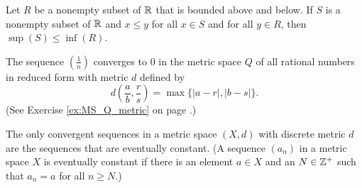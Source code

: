 	\item Let $R$ be a nonempty subset of $\mathbb{R}$ that is bounded above and below. If $S$ is a nonempty subset of $\mathbb{R}$ and $x \leq y$ for all $x \in S$ and for all $y \in R$, then $\sup(S) \leq \inf(R)$. 
	
	\item The sequence $\left(\frac{1}{n}\right)$ converges to $0$ in the metric space $Q$ of all rational numbers in reduced form with metric $d$ defined by
\[d\left(\frac{a}{b}, \frac{r}{s}\right) = \max\{| a-r |, | b-s |\}.\]
(See Exercise \ref{ex:MS_Q_metric} on page \pageref{ex:MS_Q_metric} .)

	\item The only convergent sequences in a metric space $(X,d)$ with discrete metric $d$ are the sequences that are eventually constant. (A sequence $(a_n)$ in a metric space $X$ is eventually constant if there is an element $a \in X$ and an $N \in \mathbb{Z}^+$ such that $a_n = a$ for all $n \geq N$.) 
	
	\ea

